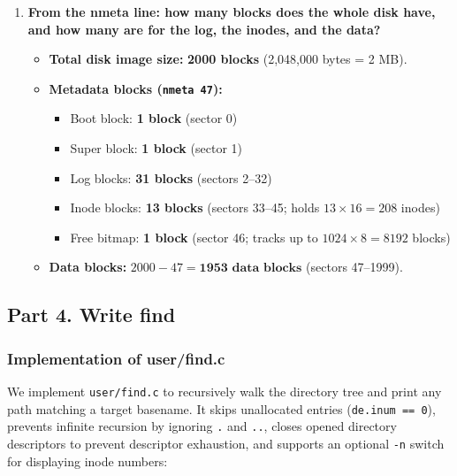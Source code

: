 \documentclass{labreport}
\begin{document}
\begin{enumerate}[leftmargin=*]
    \item \textbf{From the nmeta line: how many blocks does the whole disk have, and how many are for the log, the inodes, and the data?}
    \begin{itemize}[noitemsep, topsep=2pt]
        \item \textbf{Total disk image size:} \textbf{2000 blocks} (2,048,000 bytes = 2 MB).
        \item \textbf{Metadata blocks (\texttt{nmeta 47}):}
        \begin{itemize}[noitemsep]
            \item Boot block: \textbf{1 block} (sector 0)
            \item Super block: \textbf{1 block} (sector 1)
            \item Log blocks: \textbf{31 blocks} (sectors 2--32)
            \item Inode blocks: \textbf{13 blocks} (sectors 33--45; holds $13 \times 16 = 208$ inodes)
            \item Free bitmap: \textbf{1 block} (sector 46; tracks up to $1024 \times 8 = 8192$ blocks)
        \end{itemize}
        \item \textbf{Data blocks:} $2000 - 47 = \mathbf{1953 \text{ data blocks}}$ (sectors 47--1999).
    \end{itemize}
\end{enumerate}

\subsection{Part 4. Write find}

\subsubsection{Implementation of user/find.c}
We implement \texttt{user/find.c} to recursively walk the directory tree and print any path matching a target basename. It skips unallocated entries (\texttt{de.inum == 0}), prevents infinite recursion by ignoring \texttt{.} and \texttt{..}, closes opened directory descriptors to prevent descriptor exhaustion, and supports an optional \texttt{-n} switch for displaying inode numbers:
\end{document}
